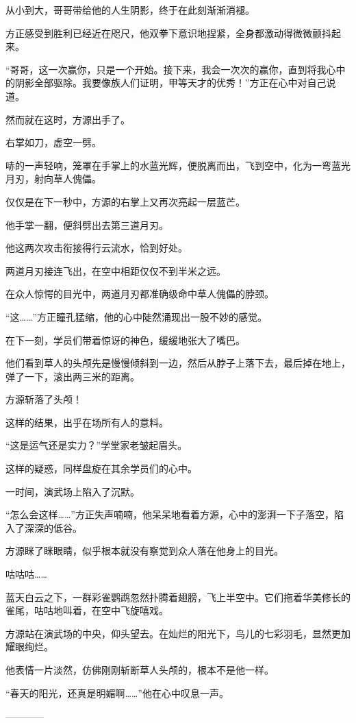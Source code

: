 \begin{this_body}
从小到大，哥哥带给他的人生阴影，终于在此刻渐渐消褪。

方正感受到胜利已经近在咫尺，他双拳下意识地捏紧，全身都激动得微微颤抖起来。

“哥哥，这一次赢你，只是一个开始。接下来，我会一次次的赢你，直到将我心中的阴影全部驱除。我要像族人们证明，甲等天才的优秀！”方正在心中对自己说道。

然而就在这时，方源出手了。

右掌如刀，虚空一劈。

哧的一声轻响，笼罩在手掌上的水蓝光辉，便脱离而出，飞到空中，化为一弯蓝光月刃，射向草人傀儡。

仅仅是在下一秒中，方源的右掌上又再次亮起一层蓝芒。

他手掌一翻，便斜劈出去第三道月刃。

他这两次攻击衔接得行云流水，恰到好处。

两道月刃接连飞出，在空中相距仅仅不到半米之远。

在众人惊愕的目光中，两道月刃都准确级命中草人傀儡的脖颈。

“这……”方正瞳孔猛缩，他的心中陡然涌现出一股不妙的感觉。

在下一刻，学员们带着惊讶的神色，缓缓地张大了嘴巴。

他们看到草人的头颅先是慢慢倾斜到一边，然后从脖子上落下去，最后掉在地上，弹了一下，滚出两三米的距离。

方源斩落了头颅！

这样的结果，出乎在场所有人的意料。

“这是运气还是实力？”学堂家老皱起眉头。

这样的疑惑，同样盘旋在其余学员们的心中。

一时间，演武场上陷入了沉默。

“怎么会这样……”方正失声喃喃，他呆呆地看着方源，心中的澎湃一下子落空，陷入了深深的低谷。

方源眯了眯眼睛，似乎根本就没有察觉到众人落在他身上的目光。

咕咕咕……

蓝天白云之下，一群彩雀鹦鹉忽然扑腾着翅膀，飞上半空中。它们拖着华美修长的雀尾，咕咕地叫着，在空中飞旋嘻戏。

方源站在演武场的中央，仰头望去。在灿烂的阳光下，鸟儿的七彩羽毛，显然更加耀眼绚烂。

他表情一片淡然，仿佛刚刚斩断草人头颅的，根本不是他一样。

“春天的阳光，还真是明媚啊……”他在心中叹息一声。

------------

\end{this_body}

